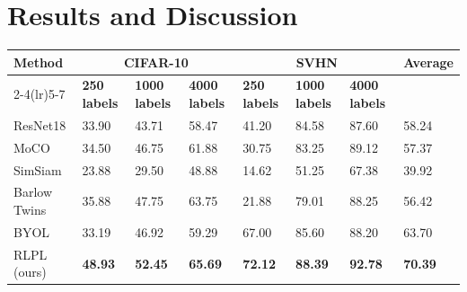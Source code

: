 \section{Results and Discussion}

\begin{table}[htbp]
\centering
\begin{tabular}{llllllll}
\hline
\multirow{2}{*}{\bf Method} & \multicolumn{3}{c}{\bf CIFAR-10}           & \multicolumn{3}{c}{\bf SVHN}          & \multirow{2}{*}{ Average} \\ \cmidrule(lr){2-4}\cmidrule(lr){5-7}
                        & \bf 250 labels & \bf 1000 labels & \bf 4000 labels & \bf 250 labels & \bf 1000 labels & \bf 4000 labels & \\ \hline
ResNet18  & 33.90  & 43.71  & 58.47 & 41.20 & 84.58  & 87.60 & 58.24 \\
MoCO & 34.50 & 46.75  & 61.88 & 30.75  & 83.25 & 89.12 & 57.37 \\
SimSiam & 23.88 & 29.50 & 48.88 & 14.62 & 51.25 & 67.38 & 39.92 \\
Barlow Twins &  35.88 & 47.75  & 63.75 & 21.88 & 79.01 & 88.25 & 56.42 \\
BYOL  & 33.19 & 46.92 & 59.29 & 67.00  & 85.60 & 88.20 & 63.70 \\ 
RLPL (ours)  & \bf  48.93  & \bf 52.45  &  \bf 65.69 & \bf 72.12 & \bf   88.39 & \bf 92.78 & \bf 70.39 \\ \hline
\end{tabular}
\label{table:2}
\end{table}


\begin{table}[!htbp]
\centering
{}
\label{table:ablation}
\end{table}


